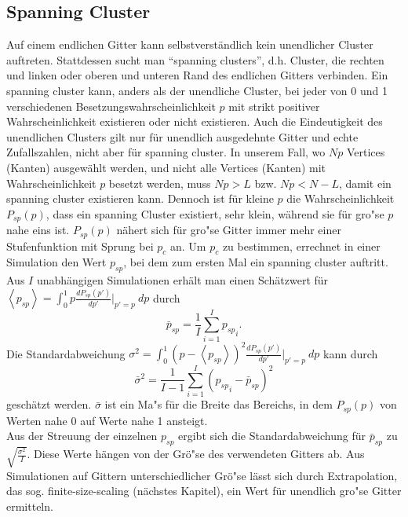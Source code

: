 \subsection{Spanning Cluster}
Auf einem endlichen Gitter kann selbstverst\"andlich kein unendlicher Cluster auftreten. Stattdessen sucht man ``spanning clusters'', d.h. Cluster, die rechten und linken oder oberen und unteren Rand des endlichen Gitters verbinden. Ein spanning cluster kann, anders als der unendliche Cluster, bei jeder von 0 und 1 verschiedenen Besetzungswahrscheinlichkeit $p$ mit strikt positiver Wahrscheinlichkeit existieren oder nicht existieren. Auch die Eindeutigkeit des unendlichen Clusters gilt nur f\"ur unendlich ausgedehnte Gitter und echte Zufallszahlen, nicht aber f\"ur spanning cluster. In unserem Fall, wo $Np$ Vertices (Kanten) ausgew\"ahlt werden, und nicht alle Vertices (Kanten) mit Wahrscheinlichkeit $p$ besetzt werden, muss $Np>L$ bzw. $Np<N-L$, damit ein spanning cluster existieren kann. Dennoch ist f\"ur kleine $p$ die Wahrscheinlichkeit $P_{sp}(p)$, dass ein spanning Cluster existiert, sehr klein, w\"ahrend sie f\"ur gro"se $p$ nahe eins ist. $P_{sp}(p)$ n\"ahert sich f\"ur gro"se Gitter immer mehr einer Stufenfunktion mit Sprung bei $p_c$ an. Um $p_c$ zu bestimmen, errechnet in einer Simulation den Wert $p_{sp}$, bei dem zum ersten Mal ein spanning cluster auftritt. Aus $I$ unabh\"angigen Simulationen erh\"alt man einen Sch\"atzwert f\"ur $\left<p_{sp}\right>=\int_0^1 p \frac{dP_{sp}(p')}{dp'}|_{p'=p}\:dp$ durch
\begin{equation}
\bar{p}_{sp}=\frac{1}{I}\sum_{i=1}^I {p_{sp}}_i.
\end{equation}
Die Standardabweichung $\sigma^2=\int_0^1 (p-\left<p_{sp}\right>)^2 \frac{dP_{sp}(p')}{dp'}|_{p'=p}\:dp$ kann durch
\begin{equation}
\bar{\sigma}^2=\frac{1}{I-1}\sum_{i=1}^I ({p_{sp}}_i-\bar{p}_{sp})^2
\end{equation}
gesch\"atzt werden. $\bar{\sigma}$ ist ein Ma"s f\"ur die Breite das Bereichs, in dem $P_{sp}(p)$ von Werten nahe 0 auf Werte nahe 1 ansteigt. \\
Aus der Streuung der einzelnen $p_{sp}$ ergibt sich die Standardabweichung f\"ur $\bar{p}_{sp}$ zu $\sqrt{\frac{\sigma^2}{I}}$. Diese Werte h\"angen von der Gr\"o"se des verwendeten Gitters ab. Aus Simulationen auf Gittern unterschiedlicher Gr\"o"se l\"asst sich durch Extrapolation, das sog. finite-size-scaling (n\"achstes Kapitel), ein Wert f\"ur unendlich gro"se Gitter ermitteln.   

